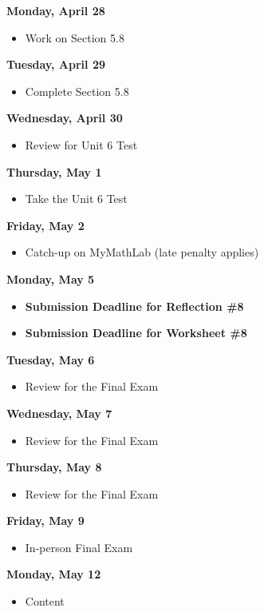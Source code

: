 \documentclass[11pt]{article}
\begin{document}
\textbf{Monday, April 28}

\begin{itemize}
\item Work on Section 5.8
\end{itemize}

\textbf{Tuesday, April 29}

\begin{itemize}
\item Complete Section 5.8
\end{itemize}

\textbf{Wednesday, April 30}

\begin{itemize}
\item Review for Unit 6 Test
\end{itemize}

\textbf{Thursday, May 1}

\begin{itemize}
\item Take the Unit 6 Test
\end{itemize}

\textbf{Friday, May 2}

\begin{itemize}
\item Catch-up on MyMathLab (late penalty applies)
\end{itemize}

\textbf{Monday, May 5}

\begin{itemize}
\item \textbf{Submission Deadline for Reflection \#8}
\item \textbf{Submission Deadline for Worksheet \#8}
\end{itemize}

\textbf{Tuesday, May 6}

\begin{itemize}
\item Review for the Final Exam
\end{itemize}

\textbf{Wednesday, May 7}

\begin{itemize}
\item Review for the Final Exam
\end{itemize}

\textbf{Thursday, May 8}

\begin{itemize}
\item Review for the Final Exam
\end{itemize}

\textbf{Friday, May 9}

\begin{itemize}
\item In-person Final Exam
\end{itemize}

\textbf{Monday, May 12}

\begin{itemize}
\item Content
\end{itemize}
\end{document}
